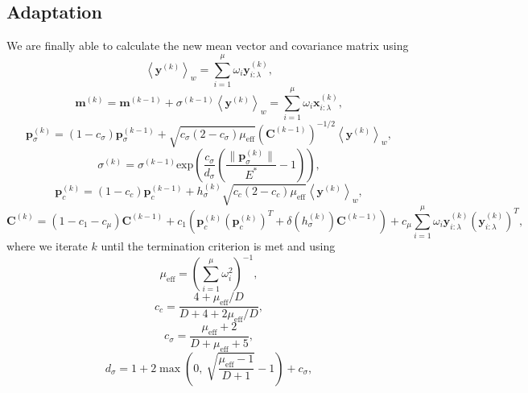 \subsection{Adaptation}
We are finally able to calculate the new mean vector and covariance matrix using
\begin{equation}
\left\langle\mathbf{y}^{(k)}\right\rangle_w=\sum_{i=1}^\mu\omega_i\mathbf{y}^{(k)}_{i:\lambda},
\end{equation}
\begin{equation}\label{mean}
\mathbf{m}^{(k)}=\mathbf{m}^{(k-1)}+\sigma^{(k-1)}\left\langle\mathbf{y}^{(k)}\right\rangle_w=\sum_{i=1}^\mu\omega_i\mathbf{x}^{(k)}_{i:\lambda},
\end{equation}
\begin{equation}
\mathbf{p}^{(k)}_\sigma=(1-c_\sigma)\mathbf{p}^{(k-1)}_\sigma+\sqrt{c_\sigma(2-c_\sigma)\mu_{\mathrm{eff}}}\left(\mathbf{C}^{(k-1)}\right)^{-1/2}\left\langle\mathbf{y}^{(k)}\right\rangle_w,
\end{equation}
\begin{equation}
\sigma^{(k)}=\sigma^{(k-1)}\mathrm{exp}\left(\frac{c_\sigma}{d_\sigma}\left(\frac{\|\mathbf{p}^{(k)}_\sigma\|}{E^*}-1\right)\right),
\end{equation}
\begin{equation}
\mathbf{p}^{(k)}_c=(1-c_c)\mathbf{p}^{(k-1)}_c+h_\sigma^{(k)}\sqrt{c_c(2-c_c)\mu_{\mathrm{eff}}}\left\langle\mathbf{y}^{(k)}\right\rangle_w,
\end{equation}
\begin{equation}\label{covariance}
\mathbf{C}^{(k)}=\left(1-c_1-c_\mu\right)\mathbf{C}^{(k-1)}+c_1\left(\mathbf{p}_c^{(k)}\left(\mathbf{p}_c^{(k)}\right)^T+\delta\left(h_\sigma^{(k)}\right)\mathbf{C}^{(k-1)}\right)+c_\mu\sum_{i=1}^\mu\omega_i\mathbf{y}^{(k)}_{i:\lambda}\left(\mathbf{y}^{(k)}_{i:\lambda}\right)^T,
\end{equation}
\noindent where we iterate $k$ until the termination criterion is met and using
\begin{equation}
\mu_{\mathrm{eff}}=\left(\sum_{i=1}^\mu\omega_i^2\right)^{-1},
\end{equation}
\begin{equation}
c_c=\frac{4+\mu_{\mathrm{eff}}/D}{D+4+2\mu_{\mathrm{eff}}/D},
\end{equation}
\begin{equation}
c_\sigma=\frac{\mu_{\mathrm{eff}}+2}{D+\mu_{\mathrm{eff}}+5},
\end{equation}
\begin{equation}
d_\sigma=1+2\max\left(0,\ \sqrt{\frac{\mu_{\mathrm{eff}}-1}{D+1}}-1\right)+c_\sigma,
\end{equation}
